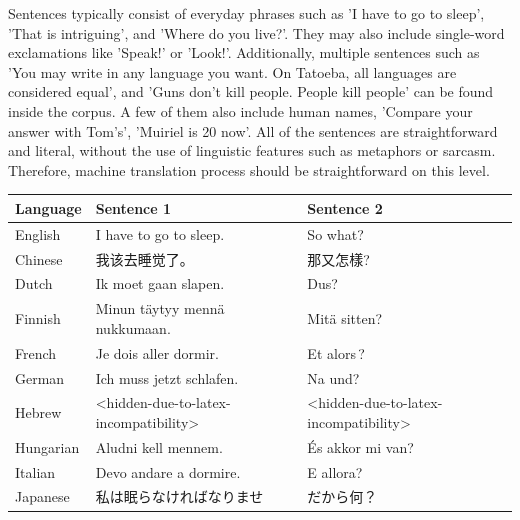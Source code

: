 \documentclass[a4paper]{article}
\begin{document}
Sentences typically consist of everyday phrases such as 'I have to go to sleep', 'That is intriguing', and 'Where do you live?'. They may also include single-word exclamations like 'Speak!' or 'Look!'. Additionally, multiple sentences such as 'You may write in any language you want. On Tatoeba, all languages are considered equal', and 'Guns don't kill people. People kill people' can be found inside the corpus. A few of them also include human names, 'Compare your answer with Tom's', 'Muiriel is 20 now'. All of the sentences are straightforward and literal, without the use of linguistic features such as metaphors or sarcasm. Therefore, machine translation process should be straightforward on this level.

\begin{CJK}{UTF8}{gbsn}
    \begin{table}[htbp]
        \centering
        \begin{tabular}{|l|l|l|}
            \hline
            \textbf{Language} & \textbf{Sentence 1}                   & \textbf{Sentence 2}                   \\
            \hline
            English           & I have to go to sleep.                & So what?                              \\
            Chinese           & 我该去睡觉了。                               & 那又怎樣?                                 \\
            Dutch             & Ik moet gaan slapen.                  & Dus?                                  \\
            Finnish           & Minun täytyy mennä nukkumaan.         & Mitä sitten?                          \\
            French            & Je dois aller dormir.                 & Et alors ?                            \\
            German            & Ich muss jetzt schlafen.              & Na und?                               \\
            Hebrew            & <hidden-due-to-latex-incompatibility> & <hidden-due-to-latex-incompatibility> \\
            Hungarian         & Aludni kell mennem.                   & És akkor mi van?                      \\
            Italian           & Devo andare a dormire.                & E allora?                             \\
            Japanese          & 私は眠らなければなりませ                          & だから何？                                 \\

\end{tabular}
\end{table}
\end{CJK}
\end{document}

